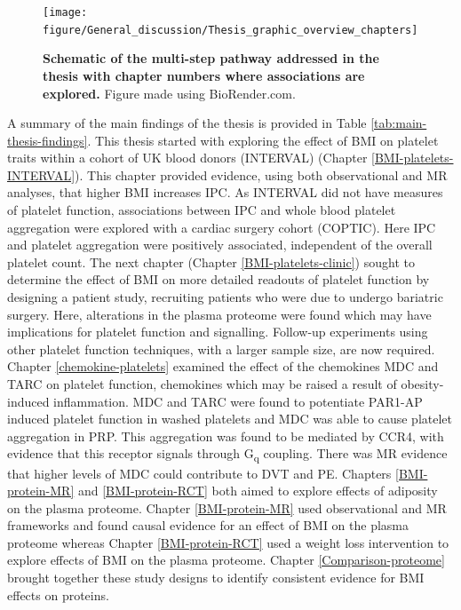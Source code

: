 \documentclass[11pt,twoside]{bristolthesis}
\begin{document}
\begin{figure}

{\centering \texttt{[image: figure/General\_discussion/Thesis\_graphic\_overview\_chapters]} 

}

\caption[Schematic of the multi-step pathway addressed in the thesis with chapter numbers where associations are explored]{\textbf{Schematic of the multi-step pathway addressed in the thesis with chapter numbers where associations are explored.} Figure made using BioRender.com.}\label{fig:Thesis-schematic-chaps}
\end{figure}
A summary of the main findings of the thesis is provided in Table \ref{tab:main-thesis-findings}. This thesis started with exploring the effect of BMI on platelet traits within a cohort of UK blood donors (INTERVAL) (Chapter \ref{BMI-platelets-INTERVAL}). This chapter provided evidence, using both observational and MR analyses, that higher BMI increases IPC. As INTERVAL did not have measures of platelet function, associations between IPC and whole blood platelet aggregation were explored with a cardiac surgery cohort (COPTIC). Here IPC and platelet aggregation were positively associated, independent of the overall platelet count. The next chapter (Chapter \ref{BMI-platelets-clinic}) sought to determine the effect of BMI on more detailed readouts of platelet function by designing a patient study, recruiting patients who were due to undergo bariatric surgery. Here, alterations in the plasma proteome were found which may have implications for platelet function and signalling. Follow-up experiments using other platelet function techniques, with a larger sample size, are now required. Chapter \ref{chemokine-platelets} examined the effect of the chemokines MDC and TARC on platelet function, chemokines which may be raised a result of obesity-induced inflammation. MDC and TARC were found to potentiate PAR1-AP induced platelet function in washed platelets and MDC was able to cause platelet aggregation in PRP. This aggregation was found to be mediated by CCR4, with evidence that this receptor signals through G\textsubscript{q} coupling. There was MR evidence that higher levels of MDC could contribute to DVT and PE. Chapters \ref{BMI-protein-MR} and \ref{BMI-protein-RCT} both aimed to explore effects of adiposity on the plasma proteome. Chapter \ref{BMI-protein-MR} used observational and MR frameworks and found causal evidence for an effect of BMI on the plasma proteome whereas Chapter \ref{BMI-protein-RCT} used a weight loss intervention to explore effects of BMI on the plasma proteome. Chapter \ref{Comparison-proteome} brought together these study designs to identify consistent evidence for BMI effects on proteins.
\end{document}
